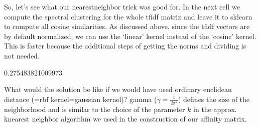 \documentclass[letterpaper,10pt,english]{jupyterBook}
\begin{document}
\sphinxAtStartPar
So, let’s see what our nearest\sphinxhyphen{}neighbor trick was good for. In the next cell we compute the spectral clustering for the whole tf\sphinxhyphen{}idf matrix and leave it to sklearn to compute all cosine similarities. As discussed above, since the tf\sphinxhyphen{}idf vectors are by default normalized, we can use the ‘linear’ kernel instead of the ‘cosine’ kernel. This is faster because the additional steps of getting the norms and dividing is not needed.

\begin{sphinxVerbatim}[commandchars=\\\{\}]
      \PYGZbs{}
 
\end{sphinxVerbatim}

\begin{sphinxVerbatim}[commandchars=\\\{\}]
0.275483821009973
\end{sphinxVerbatim}

\sphinxAtStartPar
What would the solution be like if we would have used ordinary euclidean distance (=rbf kernel=gaussian kernel)?
gamma (\(\gamma = \frac{1}{2\sigma^2}\)) defines the size of the neighborhood and is similar to the choice of the parameter \(k\) in the approx. k\sphinxhyphen{}nearest neighbor algorithm we used in the construction of our affinity matrix.
\end{document}
